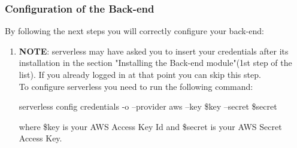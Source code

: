 \subsubsection{Configuration of the Back-end}
By following the next steps you will correctly configure your back-end:
\begin{enumerate}
\item \textbf{NOTE}: serverless may have asked you to insert your credentials after its installation in the section "Installing the Back-end module"(1st step of the list). If you already logged in at that point you can skip this step.\\ 
To configure serverless you need to run the following command:
\begin{center}
serverless config credentials -o --provider aws --key \$key --secret \$secret
\end{center}
where \$key is your AWS Access Key Id and \$secret is your AWS Secret Access Key.
\end{enumerate}
